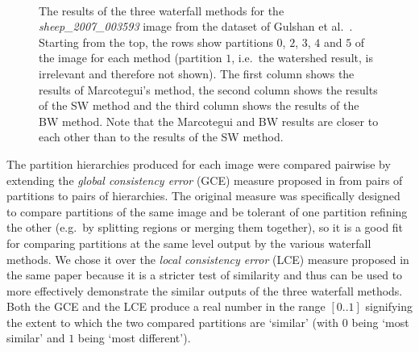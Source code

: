 \documentclass[preprint,a4paper]{elsarticle}
\newenvironment{stusubfig}[1]
{
	\begin{figure}[#1]
	\begin{center}
}
{
	\end{center}
	\end{figure}
}
\begin{document}
\begin{stusubfig}{!t}
	\\
	\hspace{4mm}%
	\hspace{4mm}%
\caption{The results of the three waterfall methods for the \emph{sheep\_2007\_003593} image from the dataset of Gulshan et al.\ \cite{gulshan10}. Starting from the top, the rows show partitions $0$, $2$, $3$, $4$ and $5$ of the image for each method (partition $1$, i.e.~the watershed result, is irrelevant and therefore not shown). The first column shows the results of Marcotegui's method, the second column shows the results of the SW method and the third column shows the results of the BW method. Note that the Marcotegui and BW results are closer to each other than to the results of the SW method.}
\label{fig:sheep}
\end{stusubfig}

The partition hierarchies produced for each image were compared pairwise by extending the \emph{global consistency error} (GCE) measure proposed in \cite{martin01} from pairs of partitions to pairs of hierarchies. The original measure was specifically designed to compare partitions of the same image and be tolerant of one partition refining the other (e.g.~by splitting regions or merging them together), so it is a good fit for comparing partitions at the same level output by the various waterfall methods. We chose it over the \emph{local consistency error} (LCE) measure proposed in the same paper because it is a stricter test of similarity and thus can be used to more effectively demonstrate the similar outputs of the three waterfall methods. Both the GCE and the LCE produce a real number in the range $[0..1]$ signifying the extent to which the two compared partitions are `similar' (with $0$ being `most similar' and $1$ being `most different').
\end{document}
